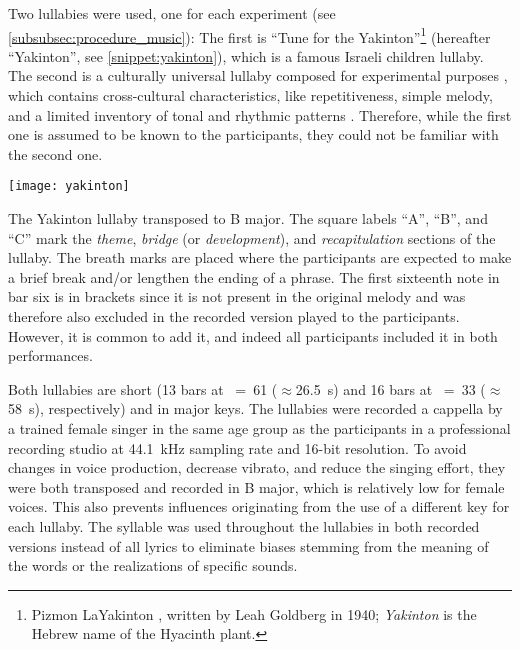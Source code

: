 Two lullabies were used, one for each experiment (see \cref{subsubsec:procedure_music}):
The first is \enquote{Tune for the Yakinton}\footnote{Pizmon LaYakinton
, written by Leah Goldberg in 1940; \emph{Yakinton} is the Hebrew name of the Hyacinth plant.} (hereafter \enquote{Yakinton}, see \cref{snippet:yakinton}), which is a famous Israeli children lullaby.
The second is a culturally universal lullaby composed for experimental purposes \citep[][pp.~22-47, see \cref{snippet:uni-lullaby}]{Twig2016universal}, which contains cross-cultural characteristics, like repetitiveness, simple melody, and a limited inventory of tonal and rhythmic patterns \citep{Unyk1992lullabies, Trehub1993maternal}.
Therefore, while the first one is assumed to be known to the participants, they could not be familiar with the second one.
%
\begin{snippet}[t]
	\centering
	\texttt{[image: yakinton]}
	\caption[Yakinton lullaby]
		{The Yakinton lullaby transposed to B major.
		The square labels \enquote{A}, \enquote{B}, and \enquote{C} mark the \emph{theme}, \emph{bridge} (or \emph{development}), and \emph{recapitulation} sections of the lullaby.
		The breath marks are placed where the participants are expected to make a brief break and/or lengthen the ending of a phrase.
		The first sixteenth note in bar six is in brackets since it is not present in the original melody and was therefore also excluded in the recorded version played to the participants.
		However, it is common to add it, and indeed all participants included it in both performances.}
	\label{snippet:yakinton}
\end{snippet}
%
Both lullabies are short (13 bars at \musQuarter~=~61 ($\approx$\SI{26.5}{\second}) and 16 bars at \musQuarterDotted~=~33 ($\approx$\SI{58}{\second}), respectively) and in major keys.
The lullabies were recorded a cappella by a trained female singer in the same age group as the participants in a professional recording studio at \SI{44.1}{\kilo\hertz} sampling rate and 16-bit resolution.
To avoid changes in voice production, decrease vibrato, and reduce the singing effort, they were both transposed and recorded in B major, which is relatively low for female voices.
This also prevents influences originating from the use of a different key for each lullaby.
The syllable \textipa{[na]} was used throughout the lullabies in both recorded versions instead of all lyrics to eliminate biases stemming from the meaning of the words or the realizations of specific sounds.
